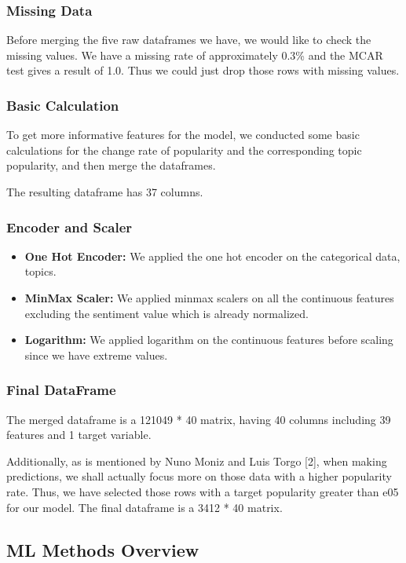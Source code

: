 \documentclass{article}
\begin{document}
\subsubsection{Missing Data}
Before merging the five raw dataframes we have, we would like to check the missing values. We have a missing rate of approximately 0.3\% and the MCAR test gives a result of 1.0. Thus we could just drop those rows with missing values.
\subsubsection{Basic Calculation}
To get more informative features for the model, we conducted some basic calculations for the change rate of popularity and the corresponding topic popularity, and then merge the dataframes.\par
The resulting dataframe has 37 columns.

\subsubsection{Encoder and Scaler}

\begin{itemize}
\item \textbf{One Hot Encoder: }
We applied the one hot encoder on the categorical data, topics.
\item \textbf{MinMax Scaler: }
We applied minmax scalers on all the continuous features excluding the sentiment value which is already normalized.
\item \textbf{Logarithm: }
We applied logarithm on the continuous features before scaling since we have extreme values.

\end{itemize}

\subsubsection{Final DataFrame}
The merged dataframe is a 121049 * 40 matrix, having 40 columns including 39 features and 1 target variable.\par
Additionally, as is mentioned by Nuno Moniz and Luis Torgo [2], when making predictions, we shall actually focus more on those data with a higher popularity rate. Thus, we have selected those rows with a target popularity greater than e05 for our model. The final dataframe is a 3412 * 40 matrix.

\subsection{ML Methods Overview}
\end{document}
